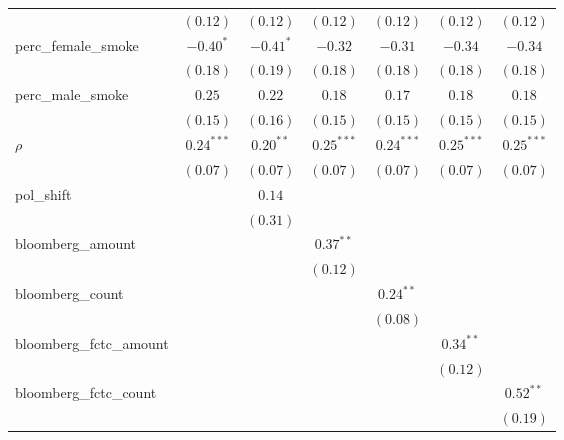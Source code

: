 \begin{table}[!h]
\begin{center}
\begin{tabular}{l c c c c c c }
                        & $(0.12)$     & $(0.12)$    & $(0.12)$     & $(0.12)$     & $(0.12)$     & $(0.12)$     \\
perc\_female\_smoke     & $-0.40^{*}$  & $-0.41^{*}$ & $-0.32$      & $-0.31$      & $-0.34$      & $-0.34$      \\
                        & $(0.18)$     & $(0.19)$    & $(0.18)$     & $(0.18)$     & $(0.18)$     & $(0.18)$     \\
perc\_male\_smoke       & $0.25$       & $0.22$      & $0.18$       & $0.17$       & $0.18$       & $0.18$       \\
                        & $(0.15)$     & $(0.16)$    & $(0.15)$     & $(0.15)$     & $(0.15)$     & $(0.15)$     \\
$\rho$                  & $0.24^{***}$ & $0.20^{**}$ & $0.25^{***}$ & $0.24^{***}$ & $0.25^{***}$ & $0.25^{***}$ \\
                        & $(0.07)$     & $(0.07)$    & $(0.07)$     & $(0.07)$     & $(0.07)$     & $(0.07)$     \\
pol\_shift              &              & $0.14$      &              &              &              &              \\
                        &              & $(0.31)$    &              &              &              &              \\
bloomberg\_amount       &              &             & $0.37^{**}$  &              &              &              \\
                        &              &             & $(0.12)$     &              &              &              \\
bloomberg\_count        &              &             &              & $0.24^{**}$  &              &              \\
                        &              &             &              & $(0.08)$     &              &              \\
bloomberg\_fctc\_amount &              &             &              &              & $0.34^{**}$  &              \\
                        &              &             &              &              & $(0.12)$     &              \\
bloomberg\_fctc\_count  &              &             &              &              &              & $0.52^{**}$  \\
                        &              &             &              &              &              & $(0.19)$     \\

\end{tabular}
\end{center}
\end{table}
